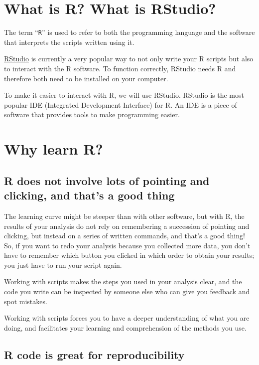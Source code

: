 \documentclass[]{book}
\begin{document}
\section{What is R? What is RStudio?}\label{what-is-r-what-is-rstudio}

The term ``\texttt{R}'' is used to refer to both the programming
language and the software that interprets the scripts written using it.

\href{https://rstudio.com}{RStudio} is currently a very popular way to
not only write your R scripts but also to interact with the R software.
To function correctly, RStudio needs R and therefore both need to be
installed on your computer.

To make it easier to interact with R, we will use RStudio. RStudio is
the most popular IDE (Integrated Development Interface) for R. An IDE is
a piece of software that provides tools to make programming easier.

\section{Why learn R?}\label{why-learn-r}

\subsection{R does not involve lots of pointing and clicking, and that's
a good
thing}\label{r-does-not-involve-lots-of-pointing-and-clicking-and-thats-a-good-thing}

The learning curve might be steeper than with other software, but with
R, the results of your analysis do not rely on remembering a succession
of pointing and clicking, but instead on a series of written commands,
and that's a good thing! So, if you want to redo your analysis because
you collected more data, you don't have to remember which button you
clicked in which order to obtain your results; you just have to run your
script again.

Working with scripts makes the steps you used in your analysis clear,
and the code you write can be inspected by someone else who can give you
feedback and spot mistakes.

Working with scripts forces you to have a deeper understanding of what
you are doing, and facilitates your learning and comprehension of the
methods you use.

\subsection{R code is great for
reproducibility}\label{r-code-is-great-for-reproducibility}
\end{document}
